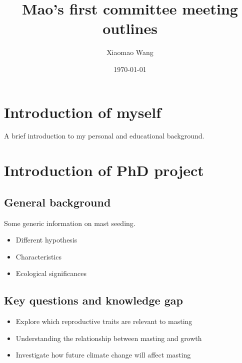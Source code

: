 \documentclass[11pt,letter]{article}
\begin{document}
\title{Mao's first committee meeting outlines}
\author{Xiaomao Wang} 
\date{\today}
\maketitle

\setlength{\parindent}{0pt}
\setlength{\parskip}{3pt}

\section{Introduction of myself}
A brief introduction to my personal and educational background. %
\section{Introduction of PhD project}
\subsection{General background}
Some generic information on mast seeding.
\begin{itemize}
	\item Different hypothesis
	\item Characteristics
	\item Ecological significances
	\end{itemize}
\subsection{Key questions and knowledge gap} %
 \begin{itemize}
	\item Explore which reproductive traits are relevant to masting
	\item Understanding the relationship between masting and growth
	\item Investigate how future climate change will affect masting
 \end{itemize}
\end{document}
